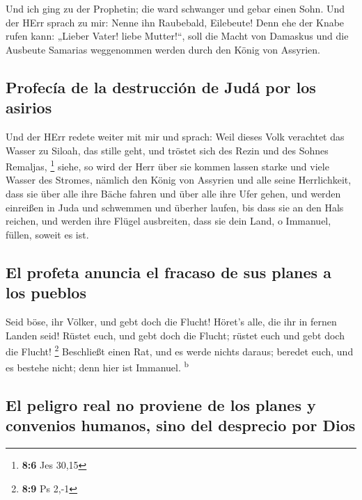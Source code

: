  Und ich ging zu der Prophetin; die ward schwanger und
gebar einen Sohn. Und der HErr sprach zu mir: Nenne ihn Raubebald,
Eilebeute!  Denn ehe der Knabe rufen kann: „Lieber Vater!
liebe Mutter!{}``, soll die Macht von Damaskus und die Ausbeute Samarias
weggenommen werden durch den König von Assyrien.

\hypertarget{profecuxeda-de-la-destrucciuxf3n-de-juduxe1-por-los-asirios}{%
\subsection{Profecía de la destrucción de Judá por los
asirios}\label{profecuxeda-de-la-destrucciuxf3n-de-juduxe1-por-los-asirios}}

 Und der HErr redete weiter mit mir und sprach:
 Weil dieses Volk verachtet das Wasser zu Siloah, das
stille geht, und tröstet sich des Rezin und des Sohnes Remaljas,
\footnote{\textbf{8:6} Jes 30,15}  siehe, so wird der Herr
über sie kommen lassen starke und viele Wasser des Stromes, nämlich den
König von Assyrien und alle seine Herrlichkeit, dass sie über alle ihre
Bäche fahren und über alle ihre Ufer gehen,  und werden
einreißen in Juda und schwemmen und überher laufen, bis dass sie an den
Hals reichen, und werden ihre Flügel ausbreiten, dass sie dein Land, o
Immanuel, füllen, soweit es ist.

\hypertarget{el-profeta-anuncia-el-fracaso-de-sus-planes-a-los-pueblos}{%
\subsection{El profeta anuncia el fracaso de sus planes a los
pueblos}\label{el-profeta-anuncia-el-fracaso-de-sus-planes-a-los-pueblos}}

 Seid böse, ihr Völker, und gebt doch die Flucht! Höret's
alle, die ihr in fernen Landen seid! Rüstet euch, und gebt doch die
Flucht; rüstet euch und gebt doch die Flucht! \footnote{\textbf{8:9} Ps
  2,-1}  Beschließt einen Rat, und es werde nichts
daraus; beredet euch, und es bestehe nicht; denn hier ist Immanuel.
\textsuperscript{b}

\hypertarget{el-peligro-real-no-proviene-de-los-planes-y-convenios-humanos-sino-del-desprecio-por-dios}{%
\subsection{El peligro real no proviene de los planes y convenios
humanos, sino del desprecio por
Dios}\label{el-peligro-real-no-proviene-de-los-planes-y-convenios-humanos-sino-del-desprecio-por-dios}}

